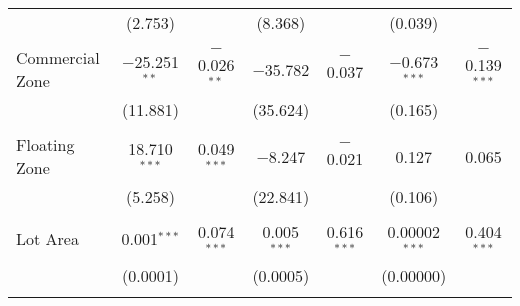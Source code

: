\documentclass[a4paper]{article}
\begin{document}
\begin{table}[!htbp]
\begin{adjustwidth}{0.5cm}{-0cm}
\begin{threeparttable}
\begin{tabular}{@{\extracolsep{-7pt}}lcccccc}
  & (2.753) &  & (8.368) & & (0.039) &  \\ 
  & & & & & & \\ 
 Commercial Zone & $-$25.251$^{**}$ & $-$0.026$^{**}$ & $-$35.782 & $-$0.037 & $-$0.673$^{***}$ & $-$0.139$^{***}$ \\ 
  & (11.881) &  & (35.624) &  & (0.165) &  \\ 
  & & & & & & \\ 
 Floating Zone & 18.710$^{***}$ & 0.049$^{***}$ & $-$8.247 & $-$0.021 & 0.127 & 0.065 \\ 
  & (5.258) & & (22.841) & & (0.106) &  \\ 
  & & & & & & \\ 
 Lot Area & 0.001$^{***}$ & 0.074$^{***}$ & 0.005$^{***}$ & 0.616$^{***}$ & 0.00002$^{***}$ & 0.404$^{***}$ \\ 
  & (0.0001) &  & (0.0005) &  & (0.00000) &  \\ 
  & & & & & & \\ 
  

\end{tabular}
\end{threeparttable}
\end{adjustwidth}
\end{table}
\end{document}

